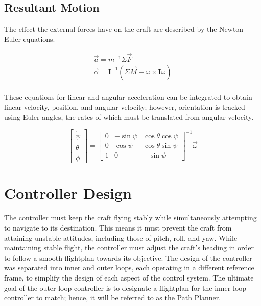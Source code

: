 \documentclass{sydeStyle}
\begin{document}
\subsection{Resultant Motion}

The effect the external forces have on the craft are described by the
Newton-Euler equations.

\begin{eqnarray*}
\vec{a} = m^{-1} \Sigma \vec{F} \\
\vec{\alpha} = \textbf{I}^{-1}(\Sigma \vec{M} - \omega \times \textbf{I} \omega) \\
\end{eqnarray*}

These equations for linear and angular acceleration can be integrated to obtain
linear velocity, position, and angular velocity; however, orientation is tracked
using Euler angles, the rates of which must be translated from angular velocity.

\begin{displaymath}
\left[ \begin{matrix}
\dot{\psi} \\
\dot{\theta} \\
\dot{\phi}
\end{matrix} \right] = \left[ \begin{matrix}
0 & -\sin \psi &  \cos \theta \cos \psi \\
0 &  \cos \psi &  \cos \theta \sin \psi \\
1 & 0          & -\sin \psi
\end{matrix} \right] ^{-1} \vec{\omega}
\end{displaymath}

\section{Controller Design}
The controller must keep the craft flying stably while simultaneously attempting
to navigate to its destination.  This means it must prevent the craft from
attaining unstable attitudes, including those of pitch, roll, and yaw.  While
maintaining stable flight, the controller must adjust the craft's heading in
order to follow a smooth flightplan towards its objective.  The design of the
controller was separated into inner and outer loops, each operating in a
different reference frame, to simplify the design of each aspect of the control
system.  The ultimate goal of the outer-loop controller is to designate a
flightplan for the inner-loop controller to match; hence, it will be referred to
as the Path Planner.
\end{document}
